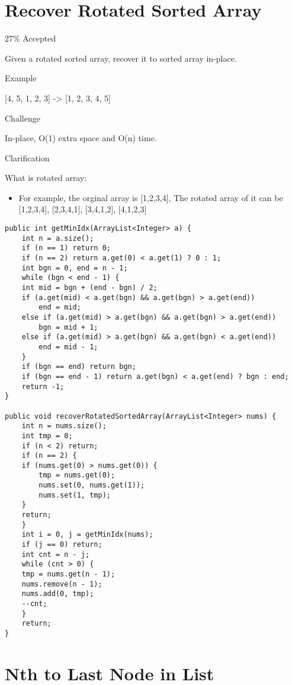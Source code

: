 \documentclass[12pt]{book}
\begin{document}
\chapter{Recover Rotated Sorted Array}
\label{sec-48}

27\% Accepted

Given a rotated sorted array, recover it to sorted array in-place.

Example

[4, 5, 1, 2, 3] -> [1, 2, 3, 4, 5]

Challenge

In-place, O(1) extra space and O(n) time.

Clarification

What is rotated array:

\begin{itemize}
\item For example, the orginal array is [1,2,3,4], The rotated array of it can be [1,2,3,4], [2,3,4,1], [3,4,1,2], [4,1,2,3]
\end{itemize}
\lstset{language=java,label= ,caption= ,numbers=none}
\begin{lstlisting}
public int getMinIdx(ArrayList<Integer> a) {
    int n = a.size();
    if (n == 1) return 0;
    if (n == 2) return a.get(0) < a.get(1) ? 0 : 1;
    int bgn = 0, end = n - 1;
    while (bgn < end - 1) {
	int mid = bgn + (end - bgn) / 2;
	if (a.get(mid) < a.get(bgn) && a.get(bgn) > a.get(end))
	    end = mid;
	else if (a.get(mid) > a.get(bgn) && a.get(bgn) > a.get(end))
	    bgn = mid + 1;
	else if (a.get(mid) > a.get(bgn) && a.get(bgn) < a.get(end))
	    end = mid - 1;
    }
    if (bgn == end) return bgn;
    if (bgn == end - 1) return a.get(bgn) < a.get(end) ? bgn : end;
    return -1;
}

public void recoverRotatedSortedArray(ArrayList<Integer> nums) {
    int n = nums.size();
    int tmp = 0;
    if (n < 2) return;
    if (n == 2) {
	if (nums.get(0) > nums.get(0)) {
	    tmp = nums.get(0);
	    nums.set(0, nums.get(1));
	    nums.set(1, tmp);
	}
	return;
    }
    int i = 0, j = getMinIdx(nums);
    if (j == 0) return;
    int cnt = n - j;
    while (cnt > 0) {
	tmp = nums.get(n - 1);
	nums.remove(n - 1);
	nums.add(0, tmp);
	--cnt;
    }
    return;
}
\end{lstlisting}
\chapter{Nth to Last Node in List}
\label{sec-49}
\end{document}
